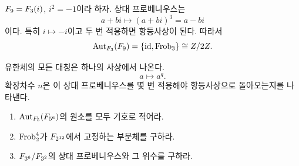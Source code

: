 \begin{example}[$\F_9/\F_3$]
$F_9=F_3(i)$, $i^2=-1$이라 하자. 상대 프로베니우스는
\[
  a+bi\longmapsto(a+bi)^3=a-bi
\]
이다. 특히 $i\mapsto-i$이고 두 번 적용하면 항등사상이 된다. 따라서
\[
  \operatorname{Aut}_{F_3}(F_9)=\{\operatorname{id},\operatorname{Frob}_3\}\cong Z/2Z.
\]
\end{example}

\begin{keyidea}
유한체의 모든 대칭은 하나의 사상에서 나온다.
\[
  a\longmapsto a^q.
\]
확장차수 $n$은 이 상대 프로베니우스를 몇 번 적용해야 항등사상으로 돌아오는지를 나타낸다.
\end{keyidea}

\begin{checkpoint}
\begin{enumerate}[label=(\alph*)]
  \item $\operatorname{Aut}_{F_5}(F_{5^6})$의 원소를 모두 기호로 적어라.
  \item $\operatorname{Frob}_2^4$가 $F_{2^{12}}$에서 고정하는 부분체를 구하라.
  \item $F_{3^6}/F_{3^2}$의 상대 프로베니우스와 그 위수를 구하라.
\end{enumerate}
\end{checkpoint}
